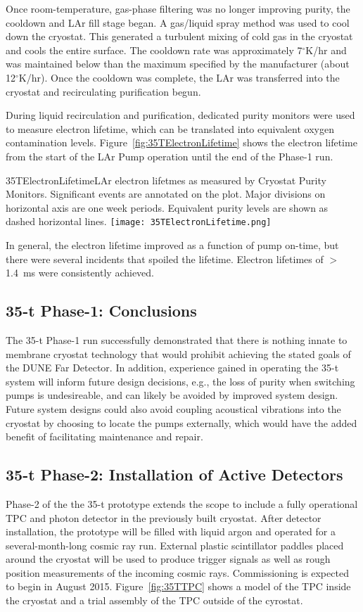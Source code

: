Once room-temperature, gas-phase filtering was no longer improving
purity, the cooldown and LAr fill stage began.  A gas/liquid spray
method was used to cool down the cryostat.  This generated a turbulent
mixing of cold gas in the cryostat and cools the entire surface.  The
cooldown rate was approximately 7$^\circ$K/hr and was maintained below
than the maximum specified by the manufacturer (about 12$^\circ$K/hr).
Once the cooldown was complete, the LAr was transferred into the
cryostat and recirculating purification begun.

During liquid recirculation and purification, dedicated
purity monitors were used to measure electron lifetime, which can 
be translated into equivalent oxygen contamination levels.
Figure~\ref{fig:35TElectronLifetime} shows the electron lifetime from the start of the
LAr Pump operation until the end of the Phase-1 run. 
\begin{cdrfigure}{35TElectronLifetime}{LAr electron lifetmes as measured by 
Cryostat Purity Monitors. Significant events are annotated on the plot. Major divisions on horizontal axis 
are one week periods. Equivalent purity levels are shown as dashed horizontal lines.}
  \texttt{[image: 35TElectronLifetime.png]}
\end{cdrfigure}
In general, the electron lifetime improved as a function of pump 
on-time, but there were several incidents that spoiled the lifetime.
Electron lifetimes of $>$1.4~ms were consistently achieved.


\subsection{35-t Phase-1: Conclusions}
The 35-t Phase-1 run successfully demonstrated that there is nothing innate to
membrane cryostat technology that would prohibit achieving the stated goals of the
DUNE Far Detector. In addition, experience gained in operating the 35-t system
will inform future design decisions, e.g., the loss of purity when switching pumps is
undesireable, and can likely be avoided by improved system design. Future system
designs could also avoid coupling acoustical vibrations into the cryostat by choosing
to locate the pumps externally, which would have the added benefit of facilitating
maintenance and repair.

\subsection{35-t Phase-2: Installation of Active Detectors}
Phase-2 of the the 35-t prototype extends the scope to include a
fully operational TPC and photon detector in the previously built
cryostat.  After detector installation, the prototype will be filled
with liquid argon and operated for a several-month-long cosmic ray
run.  External plastic scintillator paddles placed around the cryostat
will be used to produce trigger signals as well as rough position
measurements of the incoming cosmic rays.  Commissioning is expected
to begin in August 2015.  Figure~\ref{fig:35TTPC} shows a model of the
TPC inside the cryostat and a trial assembly of the TPC outside of the
cyrostat.

